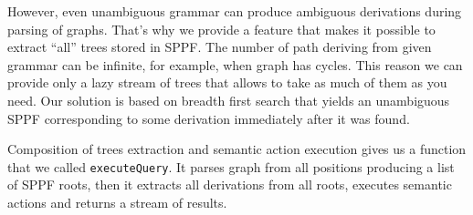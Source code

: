 However, even unambiguous grammar can produce ambiguous derivations during parsing of graphs.
That's why we provide a feature that makes it possible to extract ``all'' trees stored in SPPF.
The number of path deriving from given grammar can be infinite, for example, when graph has cycles.
This reason we can provide only a lazy stream of trees that allows to take as much of them as you need.
Our solution is based on breadth first search that yields an unambiguous SPPF corresponding to some derivation immediately after it was found.

Composition of trees extraction and semantic action execution gives us a function that we called \lstinline{executeQuery}.
It parses graph from all positions producing a list of SPPF roots, then it extracts all derivations from all roots, executes semantic actions and returns a stream of results.